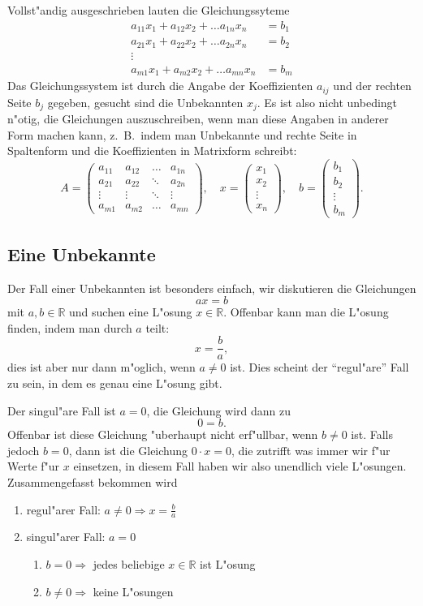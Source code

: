 Vollst"andig ausgeschrieben lauten die Gleichungssyteme
\begin{align*}
a_{11}x_1+a_{12}x_2+\dots a_{1n}x_n&=b_1\\
a_{21}x_1+a_{22}x_2+\dots a_{2n}x_n&=b_2\\
\vdots\\
a_{m1}x_1+a_{m2}x_2+\dots a_{mn}x_n&=b_m
\end{align*}
Das Gleichungssystem ist durch die Angabe der Koeffizienten $a_{ij}$
und der rechten Seite $b_j$ gegeben, gesucht sind die Unbekannten $x_j$.
Es ist also nicht unbedingt n"otig, die Gleichungen auszuschreiben,
wenn man diese Angaben in anderer Form machen kann, z.~B.~indem man
Unbekannte und rechte Seite in Spaltenform und die Koeffizienten in
Matrixform schreibt:
\[
A=\begin{pmatrix}
a_{11}&a_{12}&\dots &a_{1n}\\
a_{21}&a_{22}&\ddots&a_{2n}\\
\vdots&\vdots&\ddots&\vdots\\
a_{m1}&a_{m2}&\dots&a_{mn}
\end{pmatrix}
,\quad
x=\begin{pmatrix}
x_1\\x_2\\\vdots\\x_n
\end{pmatrix},
\quad
b=\begin{pmatrix}
b_1\\b_2\\\vdots\\b_m
\end{pmatrix}.
\]

\subsection{Eine Unbekannte}
Der Fall einer Unbekannten ist besonders einfach, wir diskutieren die
Gleichungen
\[
ax=b
\]
mit $a,b\in\mathbb R$ und suchen eine L"osung $x\in\mathbb R$.
Offenbar kann man die L"osung finden, indem man durch $a$ teilt:
$$x=\frac{b}{a},$$
dies ist aber nur dann m"oglich, wenn $a\ne 0$ ist. Dies scheint
der ``regul"are'' Fall zu sein, in dem es genau eine L"osung gibt. 

Der singul"are Fall ist $a=0$, die Gleichung wird dann zu 
\[
0=b.
\]
Offenbar ist diese Gleichung "uberhaupt nicht erf"ullbar, wenn $b\ne 0$
ist. Falls jedoch $b=0$, dann ist die Gleichung $0\cdot x=0$, die
zutrifft was immer wir f"ur Werte f"ur $x$ einsetzen, in diesem
Fall haben wir also unendlich viele L"osungen. Zusammengefasst
bekommen wird
\begin{enumerate}
\item regul"arer Fall: $a\ne 0\Rightarrow x=\frac{b}{a}$
\item singul"arer Fall: $a=0$
\begin{enumerate}
\item $b=0\Rightarrow$ jedes beliebige $x\in\mathbb R$ ist L"osung
\item $b\ne0\Rightarrow$ keine L"osungen
\end{enumerate}
\end{enumerate}

